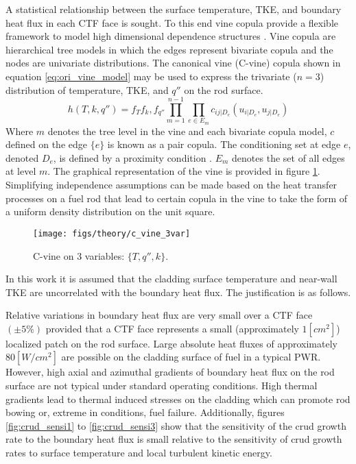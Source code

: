 A statistical relationship between the surface temperature, TKE, and boundary heat flux in each CTF face is sought.  To this end vine copula provide a flexible framework to model high dimensional dependence structures \cite{Joe2015}. Vine copula are hierarchical tree models in which the edges represent bivariate copula and the nodes are univariate distributions.  The canonical vine (C-vine) copula shown in equation \ref{eq:ori_vine_model} may be used to express the trivariate ($n=3$) distribution of temperature, TKE, and $q''$ on the rod surface. 
\begin{equation}
h(T, k, q'') = f_T f_k, f_{q''} \prod_{m=1}^{n-1} \prod_{e \in E_m} c_{ij|D_e}(u_{i|D_e}, u_{j|D_e})
\label{eq:ori_vine_model}
\end{equation}
Where $m$ denotes the tree level in the vine and each bivariate copula model, $c$ defined on the edge $\{e\}$ is known as a pair copula.  The conditioning set at edge $e$, denoted $D_e$, is defined by a proximity condition  \cite{bedford2001}. $E_m$ denotes the set of all edges at level $m$. The graphical representation of the vine is provided in figure \ref{fig:cvine3var}. 
Simplifying independence assumptions can be made based on the heat transfer processes on a fuel rod that lead to certain copula in the vine to take the form of a uniform density distribution on the unit square.

\begin{figure}[H]
    \centering
    \texttt{[image: figs/theory/c\_vine\_3var]}
    \caption{C-vine on 3 variables: $\{T,q'',k\}$.}
    \label{fig:cvine3var}
\end{figure}

In this work it is assumed that the cladding surface temperature and near-wall TKE are uncorrelated with the boundary heat flux.  The justification is as follows.

Relative variations in boundary heat flux are very small over a CTF face $(\pm 5\%)$ provided that a CTF face represents a small (approximately $1 [cm^2]$) localized patch on the rod surface.  Large absolute heat fluxes of approximately $80 [W/cm^2]$ are possible on the cladding surface of fuel in a typical PWR.  However, high axial and azimuthal gradients of boundary heat flux on the rod surface are not typical under standard operating conditions.  High thermal gradients lead to thermal induced stresses on the cladding which can promote rod bowing or, extreme in conditions, fuel failure.
Additionally, figures \ref{fig:crud_sensi1} to \ref{fig:crud_sensi3} show that the sensitivity of the crud growth rate to the boundary heat flux is small relative to the sensitivity of crud growth rates to surface temperature and local turbulent kinetic energy.

